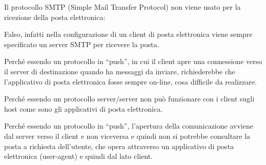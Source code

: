 \question
Il protocollo SMTP (Simple Mail Transfer Protocol) non viene usato per la ricezione della posta elettronica:

\begin{checkboxes}
	\choice Falso, infatti nella configurazione di un client di posta elettronica viene sempre specificato un server SMTP per ricevere la posta.

	\CorrectChoice Perché essendo un protocollo in \enquote{push}, in cui il client apre una connessione verso il server di destinazione quando ha messaggi da inviare, richiederebbe che l'applicativo di posta elettronica fosse sempre on-line, cosa difficile da realizzare.

	\choice Perché essendo un protocollo server/server non può funzionare con i client sugli host come sono gli applicativi di posta elettronica.

	\choice Perché essendo un protocollo in \enquote{push}, l'apertura della comunicazione avviene dal server verso il client e non viceversa e quindi non si potrebbe consultare la posta a richiesta dell'utente, che opera attraverso un applicativo di posta elettronica (user-agent) e quindi dal lato client.
\end{checkboxes}
